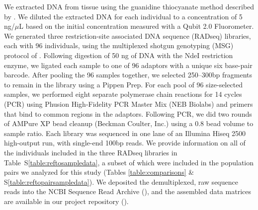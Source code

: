 
\ifembed{

}{}

\ifembed{

}{}


We extracted DNA from tissue using the guanidine thiocyanate method described
by \citet{Esselstyn2008}.
We diluted the extracted DNA for each individual to a concentration of 5
ng/$\mu$L based on the initial concentration measured with a Qubit 2.0
Fluorometer.
We generated three restriction-site associated DNA sequence (RADseq) libraries,
each with 96 individuals, using the multiplexed shotgun genotyping (MSG)
protocol of \citet{Andolfatto2011}.
Following digestion of 50 ng of DNA with the NdeI restriction enzyme, we
ligated each sample to one of 96 adaptors with a unique six base-pair barcode.
After pooling the 96 samples together, we selected 250--300bp fragments to
remain in the library using a Pippen Prep.
For each pool of 96 size-selected samples, we performed eight separate
polymerase chain reactions for 14 cycles (PCR) using Phusion High-Fidelity PCR
Master Mix (NEB Biolabs) and primers that bind to common regions in the
adaptors.
Following PCR, we did two rounds of AMPure XP bead cleanup (Beckman Coulter,
Inc.) using a 0.8 bead volume to sample ratio.
Each library was sequenced in one lane of an Illumina Hiseq 2500 high-output
run, with single-end 100bp reads.
We provide information on all of the individuals included in the three RADseq
libraries in Table~S\ref{table:reftosampledata}, a subset of which were
included in the population pairs we analyzed for this study (Tables
\ref{table:comparisons} \& S\ref{table:reftopairsampledata}).
We deposited the demultiplexed, raw sequence reads into the NCBI Sequence Read
Archive
(),
and the assembled data matrices are available in our project repository
().


